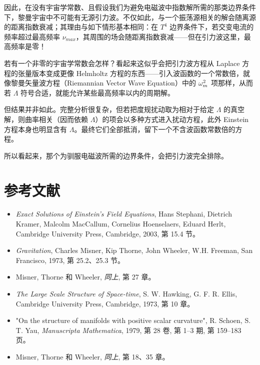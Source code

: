 因此，在没有宇宙学常数、且假设我们为避免电磁波中指数解所需的那类边界条件下，黎曼宇宙中不可能有无源引力波。不仅如此，与一个振荡源相关的解会随离源的距离指数衰减；其理由与如下情形基本相同：在 $T^{4}$ 边界条件下，若交变电流的频率超过最高频率 $\nu_{max}$，其周围的场会随距离指数衰减——但在引力波这里，最高频率是零！

若有一个非零的宇宙学常数会怎样？看起来这似乎会把引力波方程从 Laplace 方程的张量版本变成更像 Helmholtz 方程的东西——引入波函数的一个常数倍，就像黎曼矢量波方程（Riemannian Vector Wave Equation）中的 $\omega_m^{2}$ 项那样，从而若 $\Lambda$ 符号合适，就能允许某些最高频率以内的周期解。

但结果并非如此。完整分析很复杂，但若把度规扰动取为相对于给定 $\Lambda$ 的真空解，则曲率相关（因而依赖 $\Lambda$）的项会以多种方式进入扰动方程，此外 Einstein 方程本身也明显含有 $\Lambda$。最终它们全部抵消，留下一个不含波函数常数倍的方程。

所以看起来，那个为驯服电磁波所需的边界条件，会把引力波完全排除。

\section{参考文献}

\begin{itemize}
  \item[{[1]}] \emph{Exact Solutions of Einstein's Field Equations}, Hans Stephani, Dietrich Kramer, Malcolm MacCallum, Cornelius Hoenselaers, Eduard Herlt, Cambridge University Press, Cambridge, 2003, 第 15.4 节。
  \item[{[2]}] \emph{Gravitation}, Charles Misner, Kip Thorne, John Wheeler, W.H. Freeman, San Francisco, 1973, 第 25.2、25.3 节。
  \item[{[3]}] Misner, Thorne 和 Wheeler, \emph{同上}, 第 27 章。
  \item[{[4]}] \emph{The Large Scale Structure of Space-time}, S. W. Hawking, G. F. R. Ellis, Cambridge University Press, Cambridge, 1973, 第 10 章。
  \item[{[5]}] "On the structure of manifolds with positive scalar curvature", R. Schoen, S. T. Yau, \emph{Manuscripta Mathematica}, 1979, 第 28 卷, 第 1--3 期, 第 159--183 页。
  \item[{[6]}] Misner, Thorne 和 Wheeler, \emph{同上}, 第 18、35 章。
\end{itemize}
